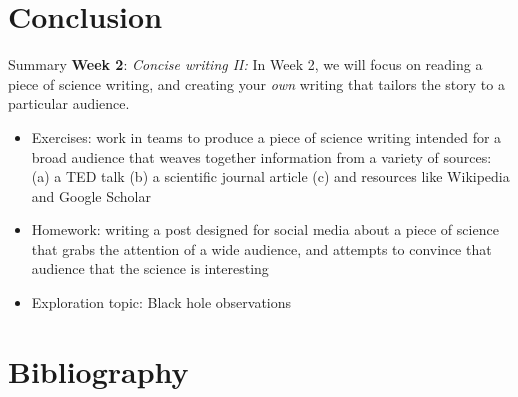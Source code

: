 \documentclass{beamer}
\begin{document}
\section{Conclusion}

\begin{frame}{Summary}
\textbf{Week 2}: \textit{Concise writing II:} In Week 2, we will focus on reading a piece of science writing, and creating your \textit{own} writing that tailors the story to a particular audience.
\begin{itemize}
\item Exercises: work in teams to produce a piece of science writing intended for a broad audience that weaves together information from a variety of sources: (a) a TED talk (b) a scientific journal article (c) and resources like Wikipedia and Google Scholar
\item Homework: writing a post designed for social media about a piece of science that grabs the attention of a wide audience, and attempts to convince that audience that the science is interesting
\item Exploration topic: Black hole observations
\end{itemize}
\end{frame}


\section{Bibliography}


\end{document}
